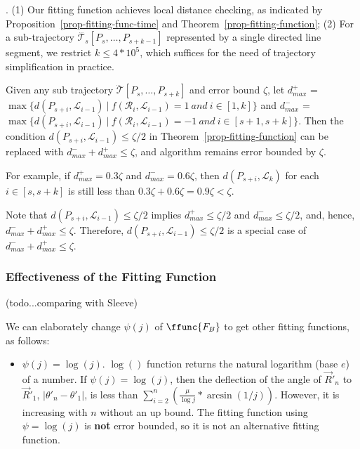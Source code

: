 {.
%
(1) Our fitting function achieves local distance checking, as indicated by Proposition~\ref{prop-fitting-func-time} and Theorem~\ref{prop-fitting-function};
(2) For a sub-trajectory $\dddot{\mathcal{T}_s}[P_s, \ldots, P_{s+k-1}]$ represented by a single directed line segment,
 we restrict $k\le 4*10^5$, which suffices  for the need of trajectory simplification in practice.



\begin{ttheorem}
Given any sub trajectory $\dddot{\mathcal{T}}[P_s, \ldots, P_{s+k}]$ and error bound $\zeta$, let $d^+_{max}$ = $\max\{d(P_{s+i}, \mathcal{L}_{i-1}) ~|~ f(\mathcal{R}_i,\mathcal{L}_{i-1})=1 ~and~ i \in [1, k]\}$ and $d^-_{max}$ = $\max \{d(P_{s+i}, \mathcal{L}_{i-1}) ~|~f(\mathcal{R}_i,\mathcal{L}_{i-1})=-1 ~and~ i \in [s+1, s+k]\}$. Then the condition $d(P_{s+i}, \mathcal{L}_{i-1}) \le \zeta/2$ in Theorem~\ref{prop-fitting-function} can be replaced with $d^-_{max} + d^+_{max} \le \zeta$, and algorithm \operb remains error bounded by $\zeta$.
\end{ttheorem}

For example, if $d^+_{max} = 0.3\zeta$ and  $d^-_{max} = 0.6\zeta$, then $d(P_{s+i}, \mathcal{L}_{k})$ for each $i \in [s, s+k]$ is still less than $0.3\zeta + 0.6\zeta= 0.9\zeta < \zeta$.

Note that  $d(P_{s+i}, \mathcal{L}_{i-1}) \le \zeta/2$ implies $d^+_{max} \le \zeta/2$ and $d^-_{max} \le \zeta/2$, and, hence, $d^-_{max} + d^+_{max} \le \zeta$.
Therefore, $d(P_{s+i}, \mathcal{L}_{i-1}) \le \zeta/2$ is a special case of  $d^-_{max} + d^+_{max} \le \zeta$.



\subsubsection{\textcolor[rgb]{1.00,0.00,0.00}{Effectiveness of the Fitting Function}}

\textcolor[rgb]{1.00,0.00,0.00}{(todo...comparing with Sleeve)}


We can elaborately change $\psi(j)$ of $\ffunc{F_B}$ to get other fitting functions, as follows:

\begin{itemize}
  \item {$\psi(j) = \log(j)$. $\log()$ function returns the natural logarithm (base $e$) of a number. If $\psi(j) = \log(j)$, then the deflection of the angle of $\vec{R}'_n$ to $\vec{R}'_1$,  $|\theta'_n - \theta'_1|$, is less than $\sum_{i=2}^n\left( \frac{\mu}{\log j} * {\arcsin(1/j)} \right)$. However, it is increasing with $n$ without an up bound. The fitting function using $\psi= \log(j)$ is \textbf{not} error bounded, so it is not an alternative fitting function.}


\end{itemize}}
